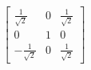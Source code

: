 \documentclass[preview]{standalone}
\begin{document}
\begin{align*}
\begin{bmatrix} \frac{1}{\sqrt{2}} & 0 & \frac{1}{\sqrt{2}} \\ 0 & 1 & 0 \\ -\frac{1}{\sqrt{2}} & 0 & \frac{1}{\sqrt{2}} \end{bmatrix}
\end{align*}
\end{document}
